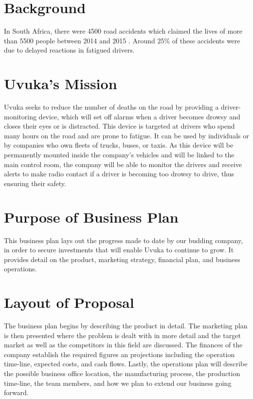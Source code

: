 \section{Background}
In South Africa, there were 4500 road accidents which claimed the lives of more than 5500 people between 2014 and 2015 \cite{EWNRoadDeaths}. Around 25\% of these accidents were due to delayed reactions in fatigued drivers.

\section{Uvuka's Mission}
Uvuka seeks to reduce the number of deaths on the road by providing a driver-monitoring device, which will set off alarms when a driver becomes drowsy and closes their eyes or is distracted. This device is targeted at drivers who spend many hours on the road and are prone to fatigue. It can be used by individuals or by companies who own fleets of trucks, buses, or taxis. As this device will be permanently mounted inside the company's vehicles and will be linked to the main control room, the company will be able to monitor the drivers and receive alerts to make radio contact if a driver is becoming too drowsy to drive, thus ensuring their safety.

\section{Purpose of Business Plan}
This business plan lays out the progress made to date by our budding company, in order to secure investments that will enable Uvuka to continue to grow. It provides detail on the product, marketing strategy, financial plan, and business operations.

\section{Layout of Proposal}
The business plan begins by describing the product in detail. The marketing plan is then presented where the problem is dealt with in more detail and the target market as well as the competitors in this field are discussed. The finances of the company establish the required figures an projections including the operation time-line, expected costs, and cash flows. Lastly, the operations plan will describe the possible business office location, the manufacturing process, the production time-line, the team members, and how we plan to extend our business going forward.

